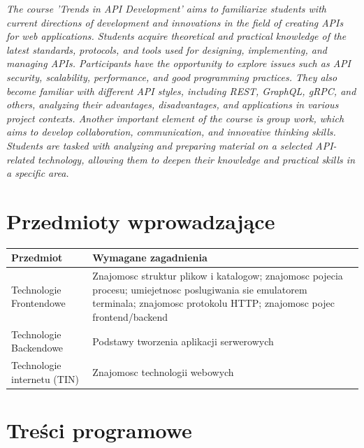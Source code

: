 \documentclass[12pt, a4paper]{article}
\begin{document}
\textit{The course 'Trends in API Development' aims to familiarize students with current directions of development and innovations in the field of creating APIs for web applications. Students acquire theoretical and practical knowledge of the latest standards, protocols, and tools used for designing, implementing, and managing APIs. Participants have the opportunity to explore issues such as API security, scalability, performance, and good programming practices. They also become familiar with different API styles, including REST, GraphQL, gRPC, and others, analyzing their advantages, disadvantages, and applications in various project contexts. Another important element of the course is group work, which aims to develop collaboration, communication, and innovative thinking skills. Students are tasked with analyzing and preparing material on a selected API-related technology, allowing them to deepen their knowledge and practical skills in a specific area.}


\section{Przedmioty wprowadzające}

\begin{tabularx}{\textwidth}{lX}
  \hline
  \textbf{Przedmiot} & \textbf{Wymagane zagadnienia} \\
  \hline
  Technologie Frontendowe & Znajomosc struktur plikow i katalogow; znajomosc pojecia procesu; umiejetnosc poslugiwania sie emulatorem terminala; znajomosc protokolu HTTP; znajomosc pojec frontend/backend \\
  Technologie Backendowe & Podstawy tworzenia aplikacji serwerowych \\
  Technologie internetu (TIN) & Znajomosc technologii webowych \\
  \hline
\end{tabularx}

\section{Treści programowe}
\end{document}
